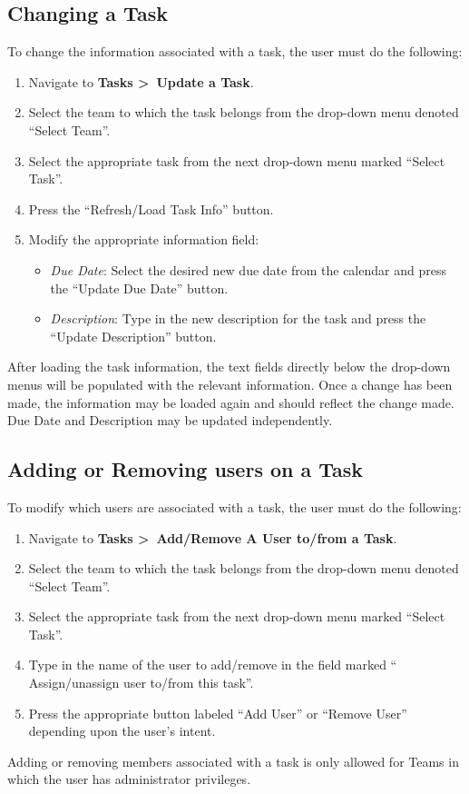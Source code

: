 \documentclass[12pt]{article}
\begin{document}
\subsection{Changing a Task}
To change the information associated with a task, the user must do the following:
\begin{enumerate}
  \item Navigate to \textbf{Tasks \textgreater~Update a Task}.
  \item Select the team to which the task belongs from the drop-down menu denoted ``Select Team''.
  \item Select the appropriate task from the next drop-down menu marked ``Select Task''.
  \item Press the ``Refresh/Load Task Info'' button.
  \item Modify the appropriate information field:
  \begin{itemize}
    \item \emph{Due Date}: Select the desired new due date from the calendar and press the ``Update Due Date'' button.
    \item \emph{Description}: Type in the new description for the task and press the ``Update Description'' button.
  \end{itemize}
\end{enumerate}
After loading the task information, the text fields directly below the drop-down menus will be populated with the relevant information.  Once a change has been made, the information may be loaded again and should reflect the change made.  Due Date and Description may be updated independently.
\subsection{Adding or Removing users on a Task}
To modify which users are associated with a task, the user must do the following:
\begin{enumerate}
  \item Navigate to \textbf{Tasks \textgreater~Add/Remove A User to/from a Task}.
  \item Select the team to which the task belongs from the drop-down menu denoted ``Select Team''.
  \item Select the appropriate task from the next drop-down menu marked ``Select Task''.
  \item Type in the name of the user to add/remove in the field marked `` Assign/unassign user to/from this task''.
  \item Press the appropriate button labeled ``Add User'' or ``Remove User'' depending upon the user's intent.
\end{enumerate}
Adding or removing members associated with a task is only allowed for Teams in which the user has administrator privileges.
\end{document}
